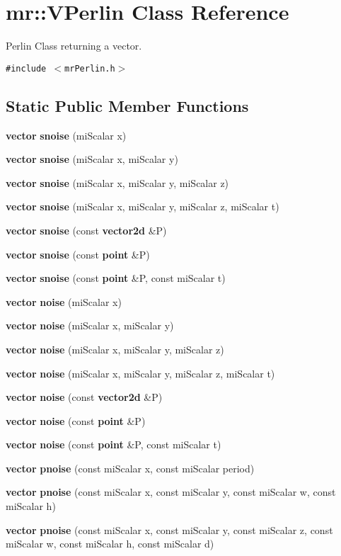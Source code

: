 \section{mr::VPerlin Class Reference}
\label{classmr_1_1VPerlin}
Perlin Class returning a vector.  


{\tt \#include $<$mr\-Perlin.h$>$}

\subsection*{Static Public Member Functions}
\begin{CompactItemize}
\item 
{\bf vector} {\bf snoise} (mi\-Scalar x)
\item 
{\bf vector} {\bf snoise} (mi\-Scalar x, mi\-Scalar y)
\item 
{\bf vector} {\bf snoise} (mi\-Scalar x, mi\-Scalar y, mi\-Scalar z)
\item 
{\bf vector} {\bf snoise} (mi\-Scalar x, mi\-Scalar y, mi\-Scalar z, mi\-Scalar t)
\item 
{\bf vector} {\bf snoise} (const {\bf vector2d} \&P)
\item 
{\bf vector} {\bf snoise} (const {\bf point} \&P)
\item 
{\bf vector} {\bf snoise} (const {\bf point} \&P, const mi\-Scalar t)
\item 
{\bf vector} {\bf noise} (mi\-Scalar x)
\item 
{\bf vector} {\bf noise} (mi\-Scalar x, mi\-Scalar y)
\item 
{\bf vector} {\bf noise} (mi\-Scalar x, mi\-Scalar y, mi\-Scalar z)
\item 
{\bf vector} {\bf noise} (mi\-Scalar x, mi\-Scalar y, mi\-Scalar z, mi\-Scalar t)
\item 
{\bf vector} {\bf noise} (const {\bf vector2d} \&P)
\item 
{\bf vector} {\bf noise} (const {\bf point} \&P)
\item 
{\bf vector} {\bf noise} (const {\bf point} \&P, const mi\-Scalar t)
\item 
{\bf vector} {\bf pnoise} (const mi\-Scalar x, const mi\-Scalar period)
\item 
{\bf vector} {\bf pnoise} (const mi\-Scalar x, const mi\-Scalar y, const mi\-Scalar w, const mi\-Scalar h)
\item 
{\bf vector} {\bf pnoise} (const mi\-Scalar x, const mi\-Scalar y, const mi\-Scalar z, const mi\-Scalar w, const mi\-Scalar h, const mi\-Scalar d)

\end{CompactItemize}
